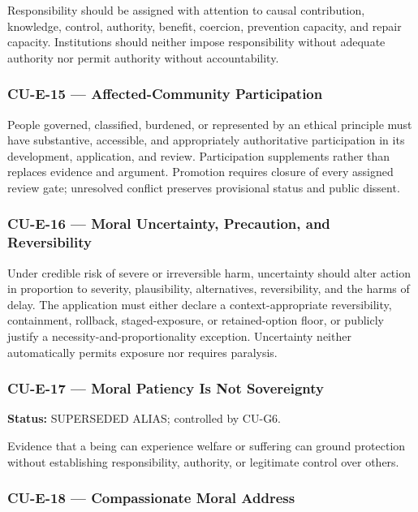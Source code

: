 \documentclass[
  11pt,
]{article}
\begin{document}
Responsibility should be assigned with attention to causal contribution,
knowledge, control, authority, benefit, coercion, prevention capacity,
and repair capacity. Institutions should neither impose responsibility
without adequate authority nor permit authority without accountability.

\subsubsection{CU-E-15 --- Affected-Community
Participation}\label{cu-e-15-affected-community-participation-1}

People governed, classified, burdened, or represented by an ethical
principle must have substantive, accessible, and appropriately
authoritative participation in its development, application, and review.
Participation supplements rather than replaces evidence and argument.
Promotion requires closure of every assigned review gate; unresolved
conflict preserves provisional status and public dissent.

\subsubsection{CU-E-16 --- Moral Uncertainty, Precaution, and
Reversibility}\label{cu-e-16-moral-uncertainty-precaution-and-reversibility-1}

Under credible risk of severe or irreversible harm, uncertainty should
alter action in proportion to severity, plausibility, alternatives,
reversibility, and the harms of delay. The application must either
declare a context-appropriate reversibility, containment, rollback,
staged-exposure, or retained-option floor, or publicly justify a
necessity-and-proportionality exception. Uncertainty neither
automatically permits exposure nor requires paralysis.

\subsubsection{CU-E-17 --- Moral Patiency Is Not
Sovereignty}\label{cu-e-17-moral-patiency-is-not-sovereignty-1}

\textbf{Status:} SUPERSEDED ALIAS; controlled by CU-G6.

Evidence that a being can experience welfare or suffering can ground
protection without establishing responsibility, authority, or legitimate
control over others.

\subsubsection{CU-E-18 --- Compassionate Moral
Address}\label{cu-e-18-compassionate-moral-address-1}
\end{document}
